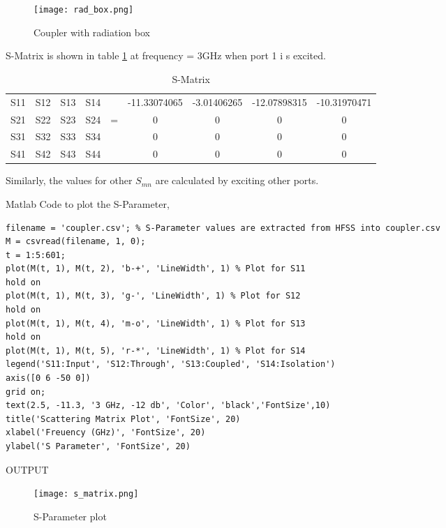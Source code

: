 \begin{figure}[!ht]
	\centering
       \texttt{[image: rad\_box.png]}
       \caption{Coupler with radiation box}\label{rad_box}
\end{figure}

S-Matrix is shown in table \ref{sm} at frequency = 3GHz when port 1 i s excited.
\begin{table}[!ht]
\centering
\begin{footnotesize}
\begin{tabular}{ |cccc|c|cccc|  }
S11 & S12 & S13 & S14 & & -11.33074065 & -3.01406265 & -12.07898315 & -10.31970471\\
S21 & S22 & S23 & S24 &=& 0 & 0 & 0 & 0 \\
S31 & S32 & S33 & S34 & & 0 & 0 & 0 & 0 \\
S41 & S42 & S43 & S44 & & 0 & 0 & 0 & 0 \\
\end{tabular}
\end{footnotesize}
\caption{\label{sm} S-Matrix}
\end{table}

Similarly, the values for other $S_{mn}$ are calculated by exciting other ports.

\newpage
Matlab Code to plot the S-Parameter,
\begin{lstlisting}
filename = 'coupler.csv'; % S-Parameter values are extracted from HFSS into coupler.csv
M = csvread(filename, 1, 0);
t = 1:5:601;
plot(M(t, 1), M(t, 2), 'b-+', 'LineWidth', 1) % Plot for S11
hold on 
plot(M(t, 1), M(t, 3), 'g-', 'LineWidth', 1) % Plot for S12
hold on
plot(M(t, 1), M(t, 4), 'm-o', 'LineWidth', 1) % Plot for S13
hold on 
plot(M(t, 1), M(t, 5), 'r-*', 'LineWidth', 1) % Plot for S14
legend('S11:Input', 'S12:Through', 'S13:Coupled', 'S14:Isolation')
axis([0 6 -50 0])
grid on;
text(2.5, -11.3, '3 GHz, -12 db', 'Color', 'black','FontSize',10)
title('Scattering Matrix Plot', 'FontSize', 20)
xlabel('Freuency (GHz)', 'FontSize', 20)
ylabel('S Parameter', 'FontSize', 20)
\end{lstlisting}


OUTPUT
\begin{figure}[!ht]
	\centering
	\texttt{[image: s\_matrix.png]}
	\caption{\label{s_matrix} S-Parameter plot}
\end{figure}

